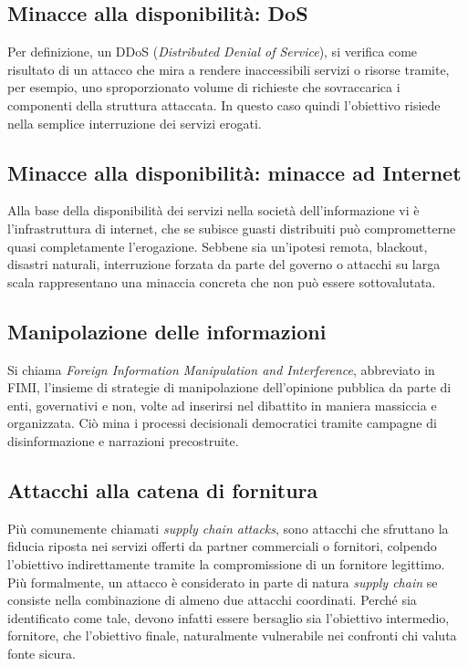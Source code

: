 \documentclass[12pt,a4paper,twoside]{report}
\begin{document}
\subsection{Minacce alla disponibilit\`a: DoS}
Per definizione, un DDoS (\textit{Distributed Denial of Service}), si verifica come risultato di un attacco che mira a rendere inaccessibili servizi o risorse tramite, per esempio, uno sproporzionato volume di richieste che sovraccarica i componenti della struttura attaccata.
In questo caso quindi l'obiettivo risiede nella semplice interruzione dei servizi erogati.\\

\subsection{Minacce alla disponibilit\`a: minacce ad Internet}
Alla base della disponibilit\`a dei servizi nella societ\`a dell'informazione vi \`e l'infrastruttura di internet, che se subisce guasti distribuiti pu\`o comprometterne quasi completamente l'erogazione. Sebbene sia un'ipotesi remota,  blackout, disastri naturali, interruzione forzata da parte del governo o attacchi su larga scala rappresentano una minaccia concreta che non pu\`o essere sottovalutata.\\

\subsection{Manipolazione delle informazioni}
Si chiama \textit{Foreign Information Manipulation and Interference}, abbreviato in FIMI, l'insieme di strategie di manipolazione dell'opinione pubblica da parte di enti, governativi e non, volte ad inserirsi nel dibattito in maniera massiccia e organizzata. Ci\`o mina i processi decisionali democratici tramite campagne di disinformazione e narrazioni precostruite.\\
\subsection{Attacchi alla catena di fornitura}
Pi\`u comunemente  chiamati \textit{supply chain attacks}, sono attacchi che sfruttano la fiducia riposta nei servizi offerti da partner commerciali o fornitori, colpendo l'obiettivo indirettamente tramite la compromissione di un fornitore legittimo.\\
Pi\`u formalmente, un attacco \`e considerato in parte di natura \textit{supply chain} se consiste nella combinazione di almeno due attacchi coordinati. Perch\'e sia identificato come tale, devono infatti essere bersaglio sia l'obiettivo intermedio, fornitore, che l'obiettivo finale, naturalmente vulnerabile nei confronti chi valuta fonte sicura. \\
\end{document}

